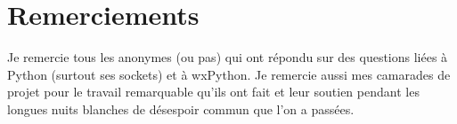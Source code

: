 \documentclass[a4paper, 11pt]{report}
\begin{document}
\section{Remerciements}
Je remercie tous les anonymes (ou pas) qui ont répondu sur des questions liées à Python
 (surtout ses sockets) et à wxPython. Je remercie aussi mes camarades de projet pour le travail remarquable qu'ils ont fait et 
leur soutien pendant les longues nuits blanches de désespoir commun que l'on a passées.
\end{document}

